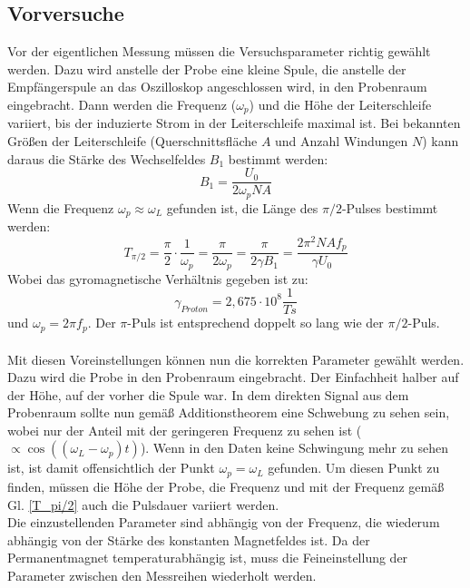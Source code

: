 \documentclass[12pt,a4paper]{article}
\begin{document}
\subsection{Vorversuche}
Vor der eigentlichen Messung müssen die Versuchsparameter richtig gewählt werden. Dazu wird anstelle der Probe eine kleine Spule, die anstelle der Empfängerspule an das Oszilloskop angeschlossen wird, in den Probenraum eingebracht. Dann werden die Frequenz ($\omega _p$) und die Höhe der Leiterschleife variiert, bis der induzierte Strom in der Leiterschleife maximal ist. Bei bekannten Größen der Leiterschleife (Querschnittsfläche $A$ und Anzahl Windungen $N$) kann daraus die Stärke des Wechselfeldes $B_1$ bestimmt werden:
\begin{equation}
\label{B1}
B_1 = \dfrac{U_0}{2 \omega _p N A}
\end{equation}
Wenn die Frequenz $\omega _p \approx \omega _L$ gefunden ist, die Länge des $\pi /2$-Pulses bestimmt werden:
\begin{equation}
\label{T_pi/2}
T_{\pi /2} = \dfrac{\pi}{2} \cdot \dfrac{1}{\omega _p} = \dfrac{\pi}{2 \omega _p} = \dfrac{\pi}{2 \gamma B_1} = \dfrac{2 \pi^2 N A f_p}{\gamma U_0}
\end{equation}
Wobei das gyromagnetische Verhältnis gegeben ist zu:
\begin{equation*}
\gamma _{Proton} = 2,675 \cdot 10^{8} \dfrac{1}{T s} 
\end{equation*}
und $\omega_p = 2 \pi f_p$.
Der $\pi$-Puls ist entsprechend doppelt so lang wie der $\pi /2$-Puls.\\
\\
Mit diesen Voreinstellungen können nun die korrekten Parameter gewählt werden. Dazu wird die Probe in den Probenraum eingebracht. Der Einfachheit halber auf der Höhe, auf der vorher die Spule war. In dem direkten Signal aus dem Probenraum sollte nun gemäß Additionstheorem eine Schwebung zu sehen sein, wobei nur der Anteil mit der geringeren Frequenz zu sehen ist ($\propto \cos ((\omega _L - \omega _p) t)$). Wenn in den Daten keine Schwingung mehr zu sehen ist, ist damit offensichtlich der Punkt $\omega _p = \omega _L$ gefunden. Um diesen Punkt zu finden, müssen die Höhe der Probe, die Frequenz und mit der Frequenz gemäß Gl. \ref{T_pi/2} auch die Pulsdauer variiert werden.\\
Die einzustellenden Parameter sind abhängig von der Frequenz, die wiederum abhängig von der Stärke des konstanten Magnetfeldes ist. Da der Permanentmagnet temperaturabhängig ist, muss die Feineinstellung der Parameter zwischen den Messreihen wiederholt werden.
\end{document}
